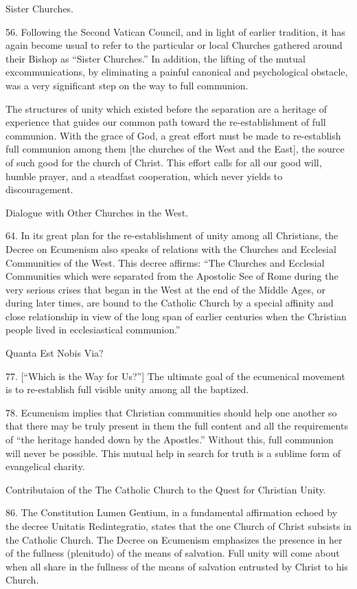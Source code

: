 \documentclass[oneside]{book}
\begin{document}
Sister Churches.

56. Following the Second Vatican Council, and in light of earlier tradition, it
has again become usual to refer to the particular or local Churches gathered
around their Bishop as ``Sister Churches.'' In addition, the lifting of the
mutual excommunications, by eliminating a painful canonical and psychological
obstacle, was a very significant step on the way to full communion.

The structures of unity which existed before the separation are a heritage of
experience that guides our common path toward the re-establishment of full
communion. With the grace of God, a great effort must be made to re-establish
full communion among them [the churches of the West and the East], the source of
such good for the church of Christ. This effort calls for all our good will,
humble prayer, and a steadfast cooperation, which never yields to
discouragement.

Dialogue with Other Churches in the West.

64. In its great plan for the re-establishment of unity among all Christians,
the Decree on Ecumenism also speaks of relations with the Churches and Ecclesial
Communities of the West. This decree affirms: ``The Churches and Ecclesial
Communities which were separated from the Apostolic See of Rome during the very
serious crises that began in the West at the end of the Middle Ages, or during
later times, are bound to the Catholic Church by a special affinity and close
relationship in view of the long span of earlier centuries when the Christian
people lived in ecclesiastical communion.''

Quanta Est Nobis Via?

77. [``Which is the Way for Us?'']  The ultimate goal of the ecumenical
movement is to re-establish full visible unity among all the baptized.

78. Ecumenism implies that Christian communities should help one another so
that there may be truly present in them the full content and all the
requirements of ``the heritage handed down by the Apostles.'' Without this, full
communion will never be possible. This mutual help in search for truth is a
sublime form of evangelical charity.

Contributaion of the The Catholic Church to the Quest for Christian Unity.

86. The Constitution Lumen Gentium, in a fundamental affirmation echoed by the
decree Unitatis Redintegratio, states that the one Church of Christ subsists in
the Catholic Church. The Decree on Ecumenism emphasizes the presence in her of
the fullness (plenitudo) of the means of salvation. Full unity will come about
when all share in the fullness of the means of salvation entrusted by Christ to
his Church.
\end{document}
